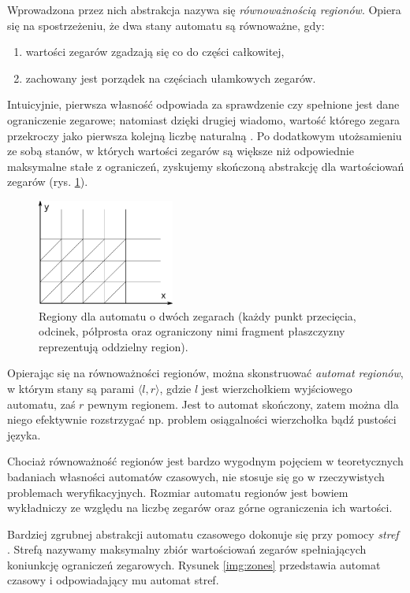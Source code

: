 \documentclass{pracamgr}
\newcommand{\pair}[2]{\langle #1, #2 \rangle}
\theoremstyle{plain}
\begin{document}
Wprowadzona przez nich abstrakcja nazywa się \emph{równoważnością
  regionów}. Opiera się na spostrzeżeniu, że dwa stany automatu są
równoważne, gdy:
\begin{samepage}
\begin{enumerate}
  \item wartości zegarów zgadzają się co do części całkowitej,
  \item zachowany jest porządek na częściach ułamkowych zegarów.
\end{enumerate}
\end{samepage}
Intuicyjnie, pierwsza własność odpowiada za sprawdzenie czy spełnione
jest dane ograniczenie zegarowe; natomiast dzięki drugiej wiadomo,
wartość którego zegara przekroczy jako pierwsza kolejną liczbę
naturalną \cite{am:decision}. Po dodatkowym utożsamieniu ze sobą stanów, w
których wartości zegarów są większe niż odpowiednie maksymalne stałe z
ograniczeń, zyskujemy skończoną abstrakcję dla wartościowań zegarów
(rys. \ref{img:regions}).
\begin{figure}
  \centering
  \includegraphics[width=0.4\textwidth]{img/ta-regions}
  \caption{Regiony dla automatu o dwóch zegarach (każdy punkt
    przecięcia, odcinek, półprosta oraz ograniczony nimi fragment
    płaszczyzny reprezentują oddzielny region).}
  \label{img:regions}
\end{figure}

Opierając się na równoważności regionów, można skonstruować
\emph{automat regionów}, w którym stany są parami $\pair{l}{r}$, gdzie
$l$ jest wierzchołkiem wyjściowego automatu, zaś $r$ pewnym
regionem. Jest to automat skończony, zatem można dla niego efektywnie
rozstrzygać np. problem osiągalności wierzchołka bądź pustości języka.

Chociaż równoważność regionów jest bardzo wygodnym pojęciem w
teoretycznych badaniach własności automatów czasowych, nie stosuje się
go w rzeczywistych problemach weryfikacyjnych. Rozmiar automatu
regionów jest bowiem wykładniczy ze względu na liczbę zegarów oraz
górne ograniczenia ich wartości.

Bardziej zgrubnej abstrakcji automatu czasowego dokonuje się przy
pomocy \emph{stref} \cite{henz-94}. Strefą nazywamy maksymalny zbiór
wartościowań zegarów spełniających koniunkcję ograniczeń zegarowych.
Rysunek \ref{img:zones} przedstawia automat czasowy i odpowiadający mu
automat stref.
\end{document}

